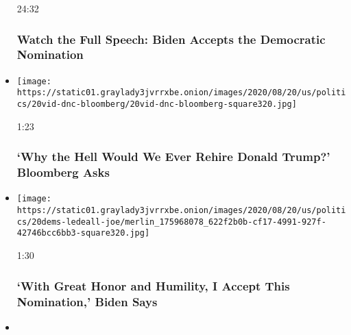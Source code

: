\begin{itemize}
  24:32

  \hypertarget{watch-the-full-speech-biden-accepts-the-democratic-nomination}{%
  \subsubsection{Watch the Full Speech: Biden Accepts the Democratic
  Nomination}\label{watch-the-full-speech-biden-accepts-the-democratic-nomination}}
\item
  \href{https://www.nytimes3xbfgragh.onion/video/us/elections/100000007299747/michael-bloomberg-speaks-dnc.html?action=click\&module=video-series-bar\&region=header\&pgtype=Article\&playlistId=video/latest-video}{}

  \texttt{[image: https://static01.graylady3jvrrxbe.onion/images/2020/08/20/us/politics/20vid-dnc-bloomberg/20vid-dnc-bloomberg-square320.jpg]}

  1:23

  \hypertarget{why-the-hell-would-we-ever-rehire-donald-trump-bloomberg-asks}{%
  \subsubsection{`Why the Hell Would We Ever Rehire Donald Trump?'
  Bloomberg
  Asks}\label{why-the-hell-would-we-ever-rehire-donald-trump-bloomberg-asks}}
\item
  \href{https://www.nytimes3xbfgragh.onion/video/us/elections/100000007299760/joe-biden-speaks-dnc.html?action=click\&module=video-series-bar\&region=header\&pgtype=Article\&playlistId=video/latest-video}{}

  \texttt{[image: https://static01.graylady3jvrrxbe.onion/images/2020/08/20/us/politics/20dems-ledeall-joe/merlin\_175968078\_622f2b0b-cf17-4991-927f-42746bcc6bb3-square320.jpg]}

  1:30

  \hypertarget{with-great-honor-and-humility-i-accept-this-nomination-biden-says}{%
  \subsubsection{`With Great Honor and Humility, I Accept This
  Nomination,' Biden
  Says}\label{with-great-honor-and-humility-i-accept-this-nomination-biden-says}}
\item
  \href{https://www.nytimes3xbfgragh.onion/video/us/elections/100000007299812/pete-buttigieg-speaks-dnc.html?action=click\&module=video-series-bar\&region=header\&pgtype=Article\&playlistId=video/latest-video}{}


\end{itemize}
